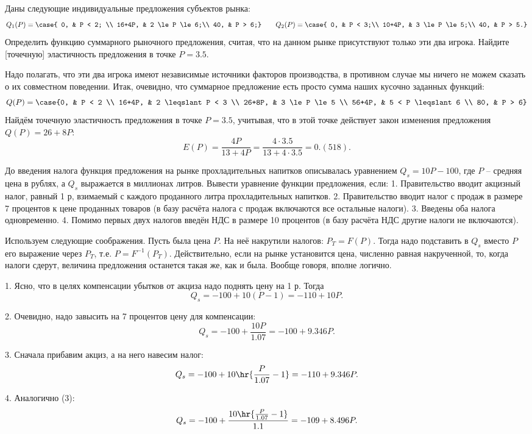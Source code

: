 \documentclass[a4paper]{article}
\begin{document}
\begin{problem}
Даны следующие индивидуальные предложения субъектов рынка:
$$Q_1(P)=\case{
0,     & P < 2; \\
16+4P, & 2 \le P \le 6;\\
40,    & P > 6;} \quad\quad
Q_2(P)=\case{
0,     & P < 3;\\
10+4P, & 3 \le P \le 5;\\
40,    & P > 5.}$$
Определить функцию суммарного рыночного предложения, считая, что на данном рынке
присутствуют только эти два игрока. Найдите [точечную] эластичность предложения в
точке $P=3.5$.
\end{problem}
\begin{solution}
Надо полагать, что эти два игрока имеют независимые источники факторов производства,
в противном случае мы ничего не можем сказать о их совместном поведении. Итак, очевидно,
что суммарное предложение есть просто сумма наших кусочно заданных функций:
$$Q(P)=\case{0, & P < 2 \\ 16+4P, & 2 \leqslant P < 3 \\
26+8P, & 3 \le P \le 5 \\ 56+4P, & 5 < P \leqslant 6 \\ 80, & P > 6}$$
Найдём точечную эластичность предложения в точке $P=3.5$, учитывая, что в этой
точке действует закон изменения предложения $Q(P)=26+8P$:
$$E(P)=\frac{4P}{13+4P}=\frac{4\cdot 3.5}{13+4\cdot 3.5}=0.(518).$$
\end{solution}

\begin{problem}
До введения налога функция предложения на рынке прохладительных напитков
описывалась уравнением $Q_s=10P-100$, где $P$ -- средняя цена в рублях, а
$Q_s$ выражается в миллионах литров. Вывести уравнение функции предложения, если:
1. Правительство вводит акцизный налог, равный 1 р, взимаемый с каждого проданного
литра прохладительных напитков. 2. Правительство вводит налог с продаж в размере
7 процентов к цене проданных товаров (в базу расчёта налога с продаж включаются
все остальные налоги). 3. Введены оба налога одновременно. 4. Помимо первых двух
налогов введён НДС в размере 10 процентов (в базу расчёта НДС другие налоги не
включаются).
\end{problem}
\begin{solution}
Используем следующие соображения. Пусть была цена $P$. На неё накрутили
налогов: $P_T=F(P)$. Тогда надо подставить в $Q_s$ вместо $P$ его выражение
через $P_T$, т.е. $P=F^{-1}(P_T)$. Действительно, если на рынке установится
цена, численно равная накрученной, то, когда налоги сдерут, величина предложения
останется такая же, как и была. Вообще говоря, вполне логично.

1. Ясно, что в целях компенсации убытков от акциза надо поднять цену на
1 р. Тогда $$Q_s=-100+10(P-1)=-110+10P.$$

2. Очевидно, надо завысить на 7 процентов цену
для компенсации: $$Q_s=-100+\frac{10P}{1.07}=-100+9.346P.$$

3. Сначала прибавим акциз, а на него навесим налог:
$$Q_s=-100+10\hr{\frac{P}{1.07}-1}=-110+9.346P.$$

4. Аналогично (3):
$$Q_s=-100+\frac{10\hr{\frac{P}{1.07}-1}}{1.1}=-109+8.496P.$$
\end{solution}
\end{document}
